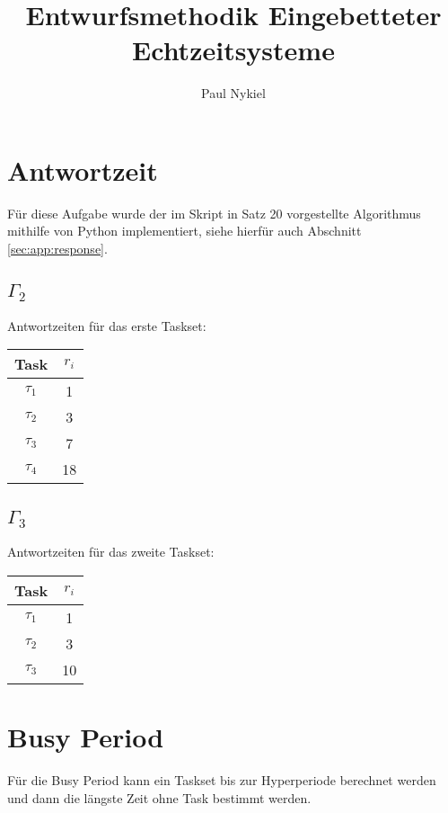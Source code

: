 \documentclass[DIN, pagenumber=false, fontsize=11pt, parskip=half]{scrartcl}
\title{Entwurfsmethodik Eingebetteter Echtzeitsysteme}
\author{Paul Nykiel}
\begin{document}
    \maketitle
    \section{Antwortzeit}
    Für diese Aufgabe wurde der im Skript in Satz 20 vorgestellte Algorithmus mithilfe von Python implementiert,
    siehe hierfür auch Abschnitt \ref{sec:app:response}.

    \subsection{$\Gamma_2$}
    Antwortzeiten für das erste Taskset:
    \begin{table}[H]
        \centering
        \begin{tabular}{cc}
            \toprule
                Task & $r_i$ \\ 
            \midrule
                $\tau_1$ & 1 \\
                $\tau_2$ & 3 \\
                $\tau_3$ & 7 \\
                $\tau_4$ & 18 \\
            \bottomrule
        \end{tabular}
    \end{table}

    \subsection{$\Gamma_3$}
    Antwortzeiten für das zweite Taskset:
    \begin{table}[H]
        \centering
        \begin{tabular}{cc}
            \toprule
                Task & $r_i$ \\ 
            \midrule
                $\tau_1$ & 1 \\
                $\tau_2$ & 3 \\
                $\tau_3$ & 10 \\
            \bottomrule
        \end{tabular}
    \end{table}


    \section{Busy Period}
    Für die Busy Period kann ein Taskset bis zur Hyperperiode berechnet werden und dann
    die längste Zeit ohne Task bestimmt werden.
\end{document}
